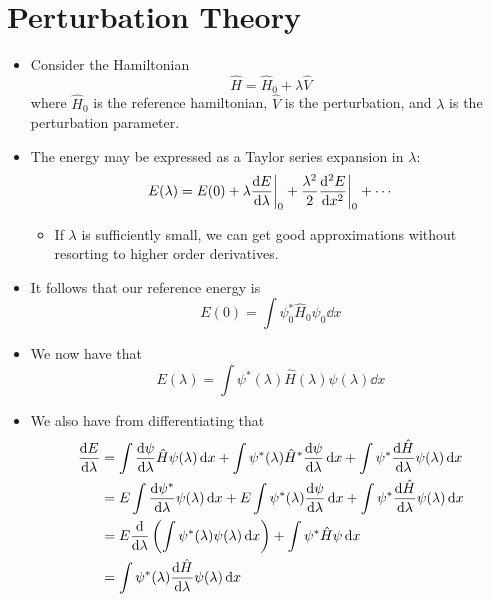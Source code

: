 \documentclass[../notes.tex]{subfiles}
\begin{document}
\section{Perturbation Theory}
\begin{itemize}
    \item {}Consider the Hamiltonian
    \begin{equation*}
        \hat{H} = \hat{H}_0+\lambda\hat{V}
    \end{equation*}
    where $\hat{H}_0$ is the reference hamiltonian, $\hat{V}$ is the perturbation, and $\lambda$ is the perturbation parameter.
    \item The energy may be expressed as a Taylor series expansion in $\lambda$:
    \begin{equation*}
        E(\lambda) = E(0)+\lambda\dv{E}{\lambda}\bigg|_0+\frac{\lambda^2}{2}\dv[2]{E}{x}\bigg|_0+\cdots
    \end{equation*}
    \begin{itemize}
        \item If $\lambda$ is sufficiently small, we can get good approximations without resorting to higher order derivatives.
    \end{itemize}
    \item It follows that our reference energy is
    \begin{equation*}
        E(0) = \int\psi_0^*\hat{H}_0\psi_0\dd{x}
    \end{equation*}
    \item We now have that
    \begin{equation*}
        E(\lambda) = \int\psi^*(\lambda)\hat{H}(\lambda)\psi(\lambda)\dd{x}
    \end{equation*}
    \item We also have from differentiating that
    \begingroup
    \allowdisplaybreaks
    \begin{align*}
        \dv{E}{\lambda} &= \int\dv{\psi}{\lambda}\hat{H}\psi(\lambda)\dd{x}+\int\psi^*(\lambda)\hat{H}^*\dv{\psi}{\lambda}\dd{x}+\int\psi^*\dv{\hat{H}}{\lambda}\psi(\lambda)\dd{x}\\
        &= E\int\dv{\psi^*}{\lambda}\psi(\lambda)\dd{x}+E\int\psi^*(\lambda)\dv{\psi}{\lambda}\dd{x}+\int\psi^*\dv{\hat{H}}{\lambda}\psi(\lambda)\dd{x}\\
        &= E\dv{\lambda}\left( \int\psi^*(\lambda)\psi(\lambda)\dd{x} \right)+\int\psi^*\hat{H}\psi\dd{x}\\
        &= \int\psi^*(\lambda)\dv{\hat{H}}{\lambda}\psi(\lambda)\dd{x}\\

\end{align*}
\end{itemize}
\end{document}
